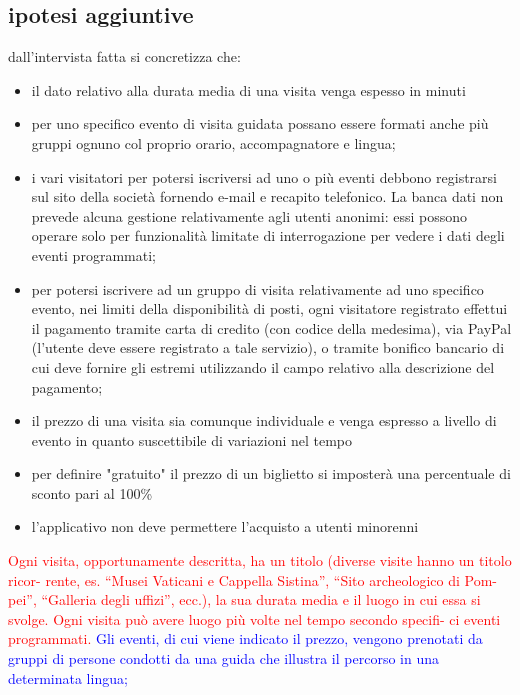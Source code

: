 \documentclass[a4paper,12pt]{report}
\begin{document}
\subsection*{ipotesi aggiuntive}
dall'intervista fatta si concretizza che:
\begin{itemize}
    \item il dato relativo alla durata media di una visita venga espesso in minuti
    \item  per	uno	specifico	evento	di	visita	guidata	possano	essere	formati	anche	più	gruppi		ognuno	
    col	proprio	orario,	accompagnatore	e	lingua; 
    \item i	 vari	 visitatori	 per	 potersi	 iscriversi	 ad	 uno	 o	 più	 eventi	 debbono	 registrarsi	 sul	 sito	 della	
    società	 fornendo	 e-mail	 e	 recapito	 telefonico.	 La	 banca	 dati	 non	 prevede	 alcuna	 gestione	
    relativamente	 agli	 utenti	 anonimi:	 essi	 possono	 operare	 solo	 per	 funzionalità	 limitate	 di	
    interrogazione	per	vedere	i	dati	degli	eventi	programmati;
    \item per	potersi	iscrivere	ad	un	gruppo	di	visita	relativamente	ad	uno	specifico	evento,	nei	limiti	
    della	 disponibilità	 di	 posti,	 ogni	 visitatore	 registrato	 effettui	 il	 pagamento	 tramite	 carta	 di	
    credito	 (con	 codice	 della	 medesima),	 via	 PayPal	 (l’utente	 deve	 essere	 registrato	 a	 tale	
    servizio),	 o	 tramite	 bonifico	 bancario	 di	 cui	 deve	 fornire	 gli	 estremi	 utilizzando	 il	 campo	
    relativo	alla	descrizione	del	pagamento;
    \item il	prezzo	di	una	visita	sia	comunque	individuale	e	venga	espresso	a	livello	di	evento	in	quanto
    suscettibile	di	variazioni	nel	tempo
    \item per definire "gratuito" il prezzo di un biglietto si imposterà una percentuale di sconto pari al 100\%
    \item l'applicativo non deve permettere l'acquisto a utenti minorenni
\end{itemize}
\textcolor{red}{ Ogni visita,
opportunamente descritta, ha un titolo (diverse visite hanno un titolo ricor-
rente, es. “Musei Vaticani e Cappella Sistina”, “Sito archeologico di Pom-
pei”, “Galleria degli uffizi”, ecc.), la sua durata media e il luogo in cui essa
si svolge. Ogni visita può avere luogo più volte nel tempo secondo specifi-
ci eventi programmati. } 
\textcolor{blue}{Gli eventi, di cui viene indicato il prezzo, vengono
prenotati da gruppi di persone condotti da una guida che illustra il percorso
in una determinata lingua;} 
\end{document}
